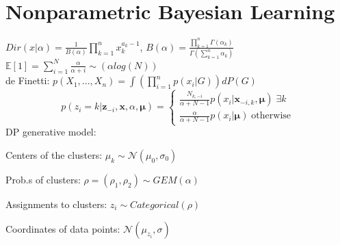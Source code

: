 \section{Nonparametric Bayesian Learning}
$Dir(x|\alpha) = \frac{1}{B(\alpha)} \prod_{k=1}^n x_k^{a_k - 1}$, $B(\alpha) = \frac{\prod_{k=1}^n \Gamma(\alpha_k)}{\Gamma(\sum_{k=1}^n \alpha_k)}$ \\
$\mathbb{E}[1] = \sum_{i=1}^N \frac{\alpha}{\alpha + i} \sim(\alpha log(N))$ \\
de Finetti: $p(X_1, ..., X_n) {=} \int (\prod_{i=1}^n p(x_i|G))dP(G)$ \\
\[ p(z_i=k|\bm{z}_{-i},\bm{x},\alpha,\bm{\mu}) = \begin{cases}
      \frac{N_{k,-i}}{\alpha + N - 1} p(x_i|\bm{x}_{-i,k},\bm{\mu}) \;\exists k \\
      \frac{\alpha}{\alpha + N - 1} p(x_i|\bm{\mu}) \;\text{otherwise}
   \end{cases}
\]
DP generative model: \\
\begin{inparaitem}[\color{red}\textbullet]
\item Centers of the clusters: $\mu_k \sim \mathcal{N}(\mu_0, \sigma_0)$ \\
\item Prob.s of clusters: $\rho = (\rho_1, \rho_2) \sim  GEM(\alpha)$ \\
\item Assignments to clusters: $z_i \sim Categorical(\rho)$ \\
\item Coordinates of data points: $\mathcal{N}(\mu_{z_i}, \sigma)$
\end{inparaitem}